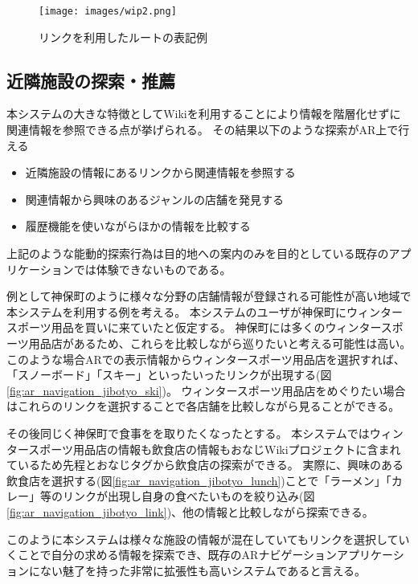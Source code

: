 \begin{figure}[h]
  \centering
  \texttt{[image: images/wip2.png]}
  \caption{リンクを利用したルートの表記例} \label{fig:ar_navigation_ad}
\end{figure}

\subsection{近隣施設の探索・推薦}

本システムの大きな特徴としてWikiを利用することにより情報を階層化せずに関連情報を参照できる点が挙げられる。
その結果以下のような探索がAR上で行える
\begin{itemize}
  \item 近隣施設の情報にあるリンクから関連情報を参照する
  \item 関連情報から興味のあるジャンルの店舗を発見する
  \item 履歴機能を使いながらほかの情報を比較する
\end{itemize}
上記のような能動的探索行為は目的地への案内のみを目的としている既存のアプリケーションでは体験できないものである。


例として神保町のように様々な分野の店舗情報が登録される可能性が高い地域で本システムを利用する例を考える。
本システムのユーザが神保町にウィンタースポーツ用品を買いに来ていたと仮定する。
神保町には多くのウィンタースポーツ用品店があるため、これらを比較しながら巡りたいと考える可能性は高い。
このような場合ARでの表示情報からウィンタースポーツ用品店を選択すれば、「スノーボード」「スキー」といったいったリンクが出現する(図\ref{fig:ar_navigation_jibotyo_ski})。
ウィンタースポーツ用品店をめぐりたい場合はこれらのリンクを選択することで各店舗を比較しながら見ることができる。

その後同じく神保町で食事をを取りたくなったとする。
本システムではウィンタースポーツ用品店の情報も飲食店の情報もおなじWikiプロジェクトに含まれているため先程とおなじタグから飲食店の探索ができる。
実際に、興味のある飲食店を選択する(図\ref{fig:ar_navigation_jibotyo_lunch})ことで「ラーメン」「カレー」等のリンクが出現し自身の食べたいものを絞り込み(図\ref{fig:ar_navigation_jibotyo_link})、他の情報と比較しながら探索できる。

このように本システムは様々な施設の情報が混在していてもリンクを選択していくことで自分の求める情報を探索でき、既存のARナビゲーションアプリケーションにない魅了を持った非常に拡張性も高いシステムであると言える。


